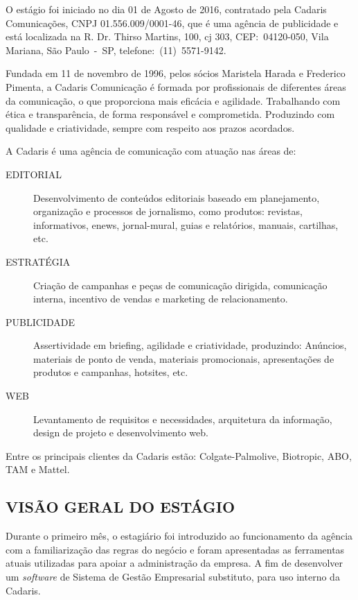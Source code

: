 \documentclass[
  12pt,				%
  openany,
  oneside,
  a4paper,			%
  english,			%
  brazil
]{article}
\numberwithin{figure}{section}
\numberwithin{table}{section}
\begin{document}
O estágio foi iniciado no dia 01 de Agosto de 2016, contratado pela Cadaris Comunicações, CNPJ 01.556.009/0001-46, que é uma agência de publicidade e está localizada na R. Dr. Thirso Martins, 100, cj 303, CEP:~04120-050, Vila Mariana, São Paulo~-~SP, telefone:~(11)~5571-9142.

Fundada em 11 de novembro de 1996, pelos sócios Maristela Harada e Frederico Pimenta, a Cadaris Comunicação é formada por profissionais de diferentes áreas da comunicação, o que proporciona mais eficácia e agilidade. Trabalhando com ética e transparência, de forma responsável e comprometida. Produzindo com qualidade e criatividade, sempre com respeito aos prazos acordados.

A Cadaris é uma agência de comunicação com atuação nas áreas de:
\vspace{-0.5cm}

\begin{description}
   \item [EDITORIAL] Desenvolvimento de conteúdos editoriais baseado em planejamento, organização e processos de jornalismo, como produtos: revistas, informativos, enews, jornal-mural, guias e relatórios, manuais, cartilhas, etc.
   \item [ESTRATÉGIA] Criação de campanhas e peças de comunicação dirigida, comunicação interna, incentivo de vendas e marketing de relacionamento.
   \item [PUBLICIDADE]  Assertividade em briefing, agilidade e criatividade, produzindo: Anúncios, materiais de ponto de venda, materiais promocionais, apresentações de produtos e campanhas, hotsites, etc.
   \item [WEB] Levantamento de requisitos e necessidades, arquitetura da informação, design de projeto e desenvolvimento web.
\end{description}

Entre os principais clientes da Cadaris estão: Colgate-Palmolive, Biotropic, ABO, TAM e Mattel.


\subsection{VISÃO GERAL DO ESTÁGIO}


Durante o primeiro mês, o estagiário foi introduzido ao funcionamento da agência com a familiarização das regras do negócio e foram apresentadas as ferramentas atuais utilizadas para apoiar a administração da empresa. A fim de desenvolver um \textit{software} de Sistema de Gestão Empresarial substituto, para uso interno da Cadaris.
\end{document}
